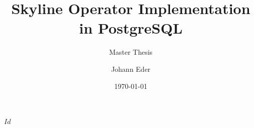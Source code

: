 


\usepackage[latin1]{inputenc}

\usepackage[top=3cm, left=4cm, right=3cm]{geometry}

\usepackage{float}

\usepackage{graphicx}
	\graphicspath{{plots/}{diagrams/}}

\usepackage[round]{natbib}

\usepackage[nofancy]{svninfo}

\usepackage[small]{caption}

\usepackage{amsmath}
\usepackage{amssymb}

\usepackage{makeidx}

\usepackage{hyperref}

\usepackage{heder}

\makeindex



\svnInfo $Id$ 


\title{Skyline Operator Implementation in PostgreSQL}
\subtitle{Master Thesis}
\author{Johann Eder}
\date{\today}














\setcounter{tocdepth}{2} 
\tableofcontents




